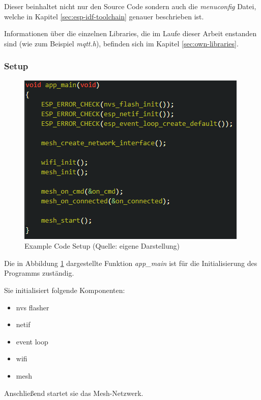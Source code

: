 Dieser beinhaltet nicht nur den Source Code sondern auch die \textit{menuconfig} Datei, welche in Kapitel \ref{sec:esp-idf-toolchain} genauer beschrieben ist.

Informationen über die einzelnen Libraries, die im Laufe dieser Arbeit enstanden sind (wie zum Beispiel \textit{mqtt.h}), befinden sich im Kapitel \ref{sec:own-libraries}.

\subsubsection{Setup}

\begin{figure}[H]
    \begin{center}
        \includegraphics[scale=0.8]{images/example_code_setup.png}
        \caption{Example Code Setup (Quelle: eigene Darstellung)}
        \label{abb:example_code_setup}
    \end{center}
\end{figure}

Die in Abbildung \ref{abb:example_code_setup} dargestellte Funktion \textit{app\_main} ist für die Initialisierung des Programms zuständig.

Sie initialisiert folgende Komponenten:

\begin{itemize}
    \item nvs flasher
    \item netif
    \item event loop
    \item wifi
    \item mesh
\end{itemize}

Anschließend startet sie das Mesh-Netzwerk.

